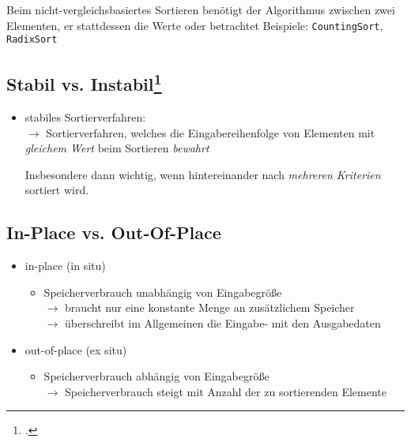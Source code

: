 \documentclass{lehramt-informatik-haupt}
\begin{document}
Beim nicht-vergleichsbasiertes Sortieren benötigt der Algorithmus
 zwischen zwei Elementen, er
 stattdessen die Werte oder betrachtet  Beispiele: \verb|CountingSort|, \verb|RadixSort|

%

\subsection{Stabil vs. Instabil\footcite[Seite 36]{aud:fs:tafeluebung-11}}

\begin{itemize}
\item stabiles Sortierverfahren:\\
%
$\rightarrow$ Sortierverfahren, welches die Eingabereihenfolge von
Elementen mit \emph{gleichem Wert} beim Sortieren \emph{bewahrt}

Insbesondere dann wichtig, wenn hintereinander nach \emph{mehreren
Kriterien} sortiert wird.
\end{itemize}

%

\subsection{In-Place vs. Out-Of-Place}

\begin{itemize}

%

\item in-place (in situ)

\begin{itemize}
\item Speicherverbrauch unabhängig von Eingabegröße\\
%
$\rightarrow$ braucht nur eine konstante Menge an zusätzlichem
Speicher\\
%
$\rightarrow$ überschreibt im Allgemeinen die Eingabe- mit den
Ausgabedaten
\end{itemize}

%

\item out-of-place (ex situ)

\begin{itemize}
\item Speicherverbrauch abhängig von Eingabegröße\\
%
$\rightarrow$ Speicherverbrauch steigt mit Anzahl der zu sortierenden
Elemente
\end{itemize}

\end{itemize}
\end{document}
